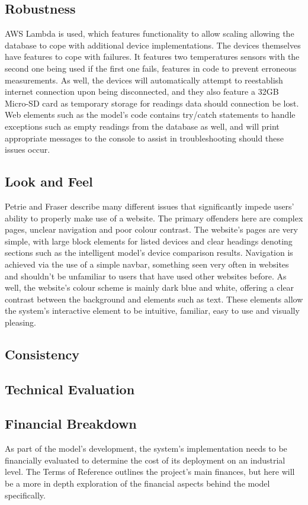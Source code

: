 \documentclass[]{report}
\begin{document}
	\subsection{Robustness}
	AWS Lambda is used, which features functionality to allow scaling\cite{awslambdadocs} allowing the database to cope with additional device implementations. The devices themselves have features to cope with failures. It features two temperatures sensors with the second one being used if the first one fails, features in code to prevent erroneous measurements. As well, the devices will automatically attempt to reestablish internet connection upon being disconnected, and they also feature a 32GB Micro-SD card as temporary storage for readings data should connection be lost. Web elements such as the model's code contains try/catch statements to handle exceptions such as empty readings from the database as well, and will print appropriate messages to the console to assist in troubleshooting should these issues occur.
	
	
	\subsection{Look and Feel}
	Petrie and Fraser\cite{petrie2004tension} describe many different issues that significantly impede users' ability to properly make use of a website. The primary offenders here are complex pages, unclear navigation and poor colour contrast. The website's pages are very simple, with large block elements for listed devices and clear headings denoting sections such as the intelligent model's device comparison results. Navigation is achieved via the use of a simple navbar, something seen very often in websites and shouldn't be unfamiliar to users that have used other websites before. As well, the website's colour scheme is mainly dark blue and white, offering a clear contrast between the background and elements such as text. These elements allow the system's interactive element to be intuitive, familiar, easy to use and visually pleasing.
	
	\subsection{Consistency}
	
	
	\subsection{Technical Evaluation}
	
	
	\subsection{Financial Breakdown}
	As part of the model's development, the system's implementation needs to be financially evaluated to determine the cost of its deployment on an industrial level. The Terms of Reference outlines the project's main finances, but here will be a more in depth exploration of the financial aspects behind the model specifically.
\end{document}
